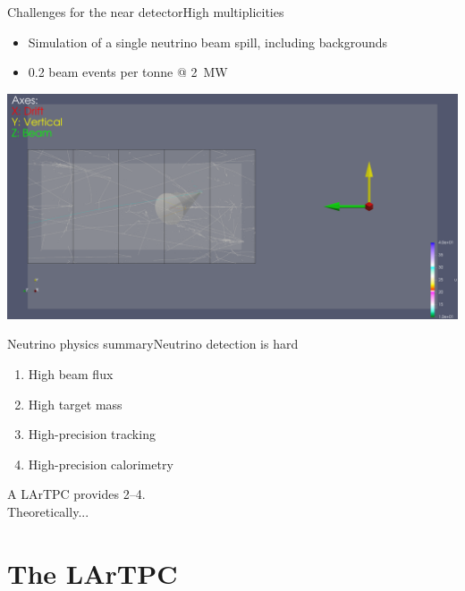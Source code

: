 \documentclass[]{beamer}
\newcommand*{\emphcol}{blue}
\newcommand*{\lartpc}{{LArTPC}}
\begin{document}
\begin{frame}{Challenges for the near detector}{High multiplicities}
	\begin{itemize}
		\item Simulation of a single neutrino beam spill, including backgrounds
		\item {\color{\emphcol} \num{0.2} beam events per tonne @ \SI{2}{\mega\watt}}
	\end{itemize}
	\centering
	\includegraphics[viewport=407 1112 4956 3389, clip, width=\textwidth]{pile-up/uid0_spill6_event461_gamma19_x}
\end{frame}

\begin{frame}{Neutrino physics summary}{Neutrino detection is hard}
	\begin{enumerate}
		\item High beam flux
		\item High target mass
		\item High-precision tracking
		\item High-precision calorimetry
	\end{enumerate}
	{\color{\emphcol}A \lartpc{} provides \numrange{2}{4}.\\Theoretically...}
\end{frame}

\section{The \lartpc{}}
\end{document}
